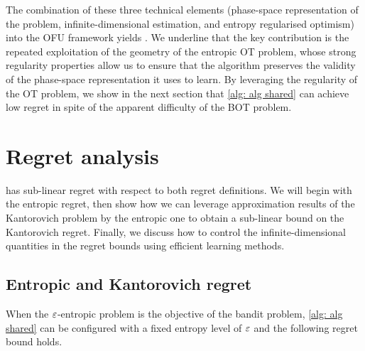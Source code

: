 The combination of these three technical elements (phase-space representation of the problem, infinite-dimensional estimation, and entropy regularised optimism) into the OFU framework yields . We underline that the key contribution is the repeated exploitation of the geometry of the entropic OT problem, whose strong regularity properties allow us to ensure that the algorithm preserves the validity of the phase-space representation it uses to learn. By leveraging the regularity of the OT problem, we show in the next section that \cref{alg: alg shared} can achieve low regret in spite of the apparent difficulty of the BOT problem.

\begin{algorithm}
    \caption{\namealgone{}\label{alg: alg shared}}
\end{algorithm}



\section{Regret analysis}\label{sec: regret of learning}

 has sub-linear regret with respect to both regret definitions. We will begin with the entropic regret, then show how we can leverage approximation results of the Kantorovich problem by the entropic one to obtain a sub-linear bound on the Kantorovich regret. Finally, we discuss how to control the infinite-dimensional quantities in the regret bounds using efficient learning methods.

\subsection{Entropic and Kantorovich regret}\label{subsec: regrets}

When the $\varepsilon$-entropic problem is the objective of the bandit problem, \cref{alg: alg shared} can be configured with a fixed entropy level of $\varepsilon$ and the following regret bound holds.

